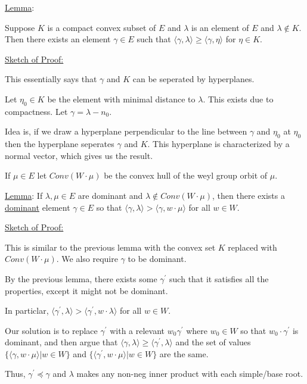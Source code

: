 \documentclass{article}
\theoremstyle{definition}
\begin{document}
\underline{Lemma}:

Suppose \(K\) is a compact convex subset of \(E\) and \(\lambda\) is an element of \(E\) and \(\lambda \notin K\). Then there exists an element \(\gamma \in E\) such that \(\langle \gamma , \lambda \rangle \geq \langle \gamma , \eta \rangle \) for \(\eta \in K\).

\underline{Sketch of Proof:}

This essentially says that \(\gamma\) and \(K\) can be seperated by hyperplanes.

Let \(\eta_0\in K\) be the element with minimal distance to \(\lambda\). This exists due to compactness. Let \(\gamma = \lambda - n_0\).

Idea is, if we draw a hyperplane perpendicular to the line between \(\gamma \) and \(\eta_0\) at \(\eta_0\) then the hyperplane seperates \(\gamma\) and \(K\). This hyperplane is characterized by a normal vector, which gives us the result.

If \(\mu \in E\) let \(Conv(W\cdot\mu)\) be the convex hull of the weyl group orbit of \(\mu\).

\underline{Lemma}: If \(\lambda ,\mu \in E\) are dominant and \(\lambda \notin Conv(W\cdot \mu)\), then there exists a \underline{dominant} element \(\gamma\in E\) so that \(\langle \gamma ,\lambda  \rangle > \langle \gamma , w\cdot \mu \rangle \) for all \(w\in W\).

\underline{Sketch of Proof:}

This is similar to the previous lemma with the convex set \(K\) replaced with \(Conv(W\cdot \mu)\). We also require \(\gamma\) to be dominant.

By the previous lemma, there exists some \(\gamma ^{\prime} \) such that it satisfies all the properties, except it might not be dominant.

In particlar, \(\langle \gamma ^{\prime} , \lambda \rangle > \langle \gamma^{\prime} , w\cdot \lambda  \rangle \) for all \(w\in W\).

Our solution is to replace \(\gamma^{\prime} \) with a relevant \(w_0 \gamma ^{\prime} \) where \(w_0\in W\) so that \(w_0\cdot \gamma ^{\prime} \) is dominant, and then argue that \(\langle \gamma ,\lambda  \rangle \geq \langle \gamma ^{\prime} , \lambda \rangle \) and the set of values \(\{\langle \gamma ,w\cdot \mu \rangle | w\in W\}\) and \(\{ \langle \gamma ^{\prime} , w\cdot \mu \rangle | w\in W \} \) are the same. 

Thus, \(\gamma ^{\prime} \preceq \gamma\) and \(\lambda\) makes any non-neg inner product with each simple/base root.
\end{document}
